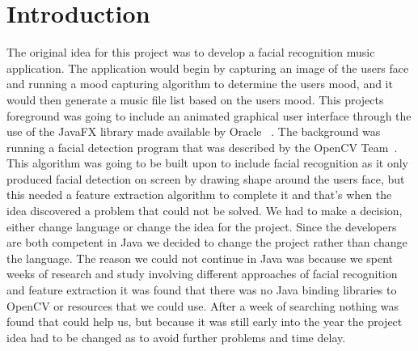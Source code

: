 \chapter{Introduction}
The original idea for this project was to develop a facial recognition music application. The application would begin by capturing an image of the users face and running a mood capturing algorithm to determine the users mood, and it would then generate a music file list based on the users mood. This projects foreground was going to include an animated graphical user interface through the use of the JavaFX library made available by Oracle ~\cite{javafx}. The background was running a facial detection program that was described by the OpenCV Team~\cite{opencv}. This algorithm was going to be built upon to include facial recognition as it only produced facial detection on screen by drawing shape around the users face, but this needed a feature extraction algorithm to complete it and that's when the idea discovered a problem that could not be solved. We had to make a decision,  either change language or change the idea for the project. Since the developers are both competent in Java we decided to change the project rather than change the language. The reason we could not continue in Java was because we spent weeks of research and study involving different approaches of facial recognition and feature extraction it was found that there was no Java binding libraries to OpenCV or resources that we could use. After a week of searching nothing was found that could help us, but because it was still early into the year the project idea had to be changed as to avoid further problems and time delay.

